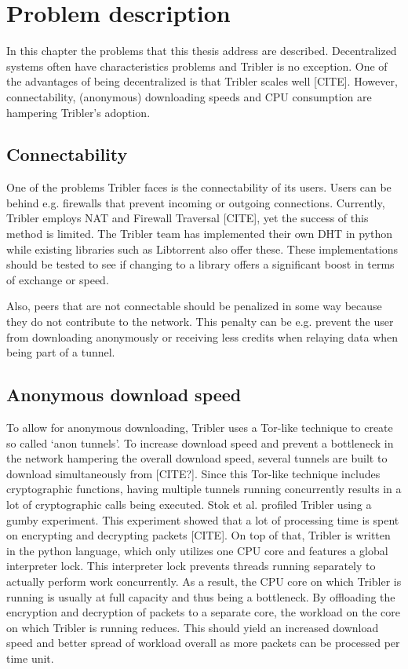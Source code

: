 \chapter{Problem description}
\label{chp:problem-description}
In this chapter the problems that this thesis address are described.
Decentralized systems often have characteristics problems and Tribler is no exception.
One of the advantages of being decentralized is that Tribler scales well [CITE].
However, connectability, (anonymous) downloading speeds and CPU consumption are hampering Tribler's adoption.

\section{Connectability}
One of the problems Tribler faces is the connectability of its users.
Users can be behind e.g. firewalls that prevent incoming or outgoing connections.
Currently, Tribler employs NAT and Firewall Traversal [CITE], yet the success of this method is limited.
The Tribler team has implemented their own DHT in python while existing libraries such as Libtorrent also offer these.
These implementations should be tested to see if changing to a library offers a significant boost in terms of exchange or speed.

Also, peers that are not connectable should be penalized in some way because they do not contribute to the network.
This penalty can be e.g. prevent the user from downloading anonymously or receiving less credits when relaying data when being part of a tunnel.

\section{Anonymous download speed}
To allow for anonymous downloading, Tribler uses a Tor-like technique to create so called `anon tunnels'.
To increase download speed and prevent a bottleneck in the network hampering the overall download speed, several tunnels are built to download simultaneously from [CITE?].
Since this Tor-like technique includes cryptographic functions, having multiple tunnels running concurrently results in a lot of cryptographic calls being executed.
Stok et al. profiled Tribler using a gumby experiment. This experiment showed that a lot of processing time is spent on encrypting and decrypting packets [CITE].
On top of that, Tribler is written in the python language, which only utilizes one CPU core and features a global interpreter lock.
This interpreter lock prevents threads running separately to actually perform work concurrently.
As a result, the CPU core on which Tribler is running is usually at full capacity and thus being a bottleneck.
By offloading the encryption and decryption of packets to a separate core, the workload on the core on which Tribler is running reduces.
This should yield an increased download speed and better spread of workload overall as more packets can be processed per time unit.

